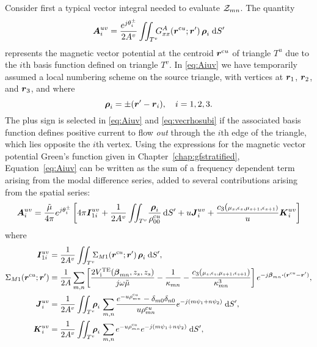  Consider first a typical vector integral needed
 to evaluate $\mathcal{Z}_{mn}$.  
 The quantity
 \begin{equation}
   \boldsymbol{A}_i^{uv} =   \frac{e^{j\theta_i^\pm}}{2A^v}  \iint_{T^v}  \!\!\!
           G^A_{xx}(\boldsymbol{r}^{\text{c}u};\boldsymbol{r}') \, \boldsymbol{\rho}_i \; \text{d} S' \label{eq:Aiuv}
 \end{equation}
 represents the magnetic vector potential at the centroid $\boldsymbol{r}^{\text{c}u}$ of triangle
 $T^u$ due to the $i\text{th}$ basis function defined on triangle $T^v$.
 In \eqref{eq:Aiuv} we have temporarily assumed a local numbering scheme
 on the source triangle, with vertices at $\boldsymbol{r}_1$, $\boldsymbol{r}_2$, and $\boldsymbol{r}_3$,
 and where 
 \begin{equation}
   \boldsymbol{\rho}_i =  \pm (\boldsymbol{r}' - \boldsymbol{r}_i), \quad i = 1, 2, 3.
   \label{eq:vecrhosubi}
 \end{equation}
 The plus sign is selected in \eqref{eq:Aiuv} and \eqref{eq:vecrhosubi} 
 if the associated basis function defines 
 positive current to flow {\em out\/} through the $i\text{th}$ edge of
 the triangle, which lies opposite the $i$th vertex.
 Using the expressions for the magnetic vector potential Green's
 function given in  Chapter~\ref{chap:gfstratified}, Equation~\eqref{eq:Aiuv} can 
 be written as  the sum of a frequency dependent term arising from the modal
 difference series, added to several contributions arising from the
 spatial series:
 \begin{equation}
   \A_i^{uv} = \frac{\tilde{\mu}}{4\pi} e^{j\theta^{\pm}_i} 
   \left[
     4\pi \I_{1i}^{uv}%
     + 
     \frac{1}{2A^v}  \iint_{T^v}  \!
     \frac{\vecrho_i}{\rhocu_{00}} \, \d S' +
     u \J_i^{uv} +
     \frac{c_3(\scriptstyle\mu_s,\epsilon_s,\mu_{s+1},\epsilon_{s+1})}%
     {u} \K_i^{uv} 
   \right] \label{eq:Aiuv2}
 \end{equation}
 where
 \begin{subequations}
   \begin{align}
     \I_{1i}^{uv} &=
     \frac{1}{2A^v}  \iint_{T^v}  \!\!\!
     \Sigma_{M1}(\rcu;\r')
     \, \vecrho_i \; \d S', \\
     \Sigma_{M1}(\rcu;\r') &= 
     \frac{1}{2A} \summn 
     \left[
       \frac{2\Vi\TE(\vecbeta_{mn},z_s,z_s)}{j\omega\tilde{\mu}}
       - \frac{1}{\kappa_{mn}} -
       \frac{c_3({\scriptstyle\mu_s,\epsilon_s,\mu_{s+1},\epsilon_{s+1}})}%
       {\kappa_{mn}^3}
     \right] e^{-j\vecbeta_{mn}\bdot(\rcu-\r')}, \\
     \J_i^{uv} &=
     \frac{1}{2A^v}  \iint_{T^v}  \!\!\!
     \vecrho_i \,
     \summn  \frac{e^{-u\rhocu_{mn}}-\delta_{m0}\delta_{n0}}{u\rhocu_{mn}}  
     e^{-j(m\psi_1+n\psi_2)} \; \d S', \\
     \K_i^{uv} &=
     \frac{1}{2A^v}  \iint_{T^v}  \!\!\!
     \vecrho_i \,
     \summn  e^{-u\rhocu_{mn}}
     e^{-j(m\psi_1+n\psi_2)} \; \d S',
   \end{align}
 \end{subequations}
